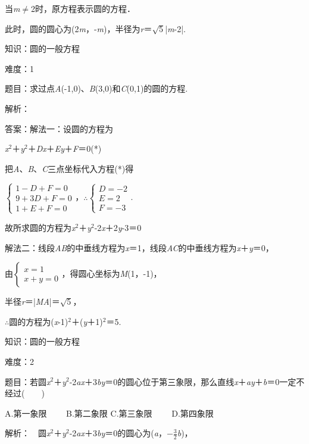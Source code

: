 \documentclass{article} %
\begin{document}
当\textit{m}$\mathrm{\neq}$2时，原方程表示圆的方程．

此时，圆的圆心为(2\textit{m}，-\textit{m})，半径为\textit{r}＝$\sqrt{5}$|\textit{m}-2|.

知识：圆的一般方程

难度：1

题目：求过点\textit{A}(-1,0)、\textit{B}(3,0)和\textit{C}(0,1)的圆的方程.

解析：

答案：解法一：设圆的方程为

\textit{x}${}^{2}$＋\textit{y}${}^{2}$＋\textit{Dx}＋\textit{Ey}＋\textit{F}＝0(*)

把\textit{A}、\textit{B}、\textit{C}三点坐标代入方程(*)得

$\left\{\begin{array}{r} 1-D+F=0\\ 9+3D+F=0\\ 1+E+F=0 \end{array} \right.$，$\mathrm{\therefore}$$\left\{\begin{array}{r} D=-2\\ E=2\\ F=-3 \end{array} \right.$.

故所求圆的方程为\textit{x}${}^{2}$＋\textit{y}${}^{2}$-2\textit{x}＋2\textit{y}-3＝0

解法二：线段\textit{AB}的中垂线方程为\textit{x}＝1，线段\textit{AC}的中垂线方程为\textit{x}＋\textit{y}＝0，

由$\left\{\begin{array}{r} x=1\\ x+y=0 \end{array} \right.$，得圆心坐标为\textit{M}(1，-1)，

半径\textit{r}＝|\textit{MA}|＝$\sqrt{5}$，

$\mathrm{\therefore}$圆的方程为(\textit{x}-1)${}^{2}$＋(\textit{y}＋1)${}^{2}$＝5.

知识：圆的一般方程

难度：2

题目：若圆\textit{x}${}^{2}$＋\textit{y}${}^{2}$-2\textit{ax}＋3\textit{by}＝0的圆心位于第三象限，那么直线\textit{x}＋\textit{ay}＋\textit{b}＝0一定不经过(　　)

A.第一象限　　 B.第二象限  C.第三象限　　 D.第四象限

解析：　圆\textit{x}${}^{2}$＋\textit{y}${}^{2}$-2\textit{ax}＋3\textit{by}＝0的圆心为(\textit{a}，$-\frac{3}{2}$\textit{b})，
\end{document}

